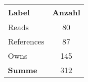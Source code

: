 \begin{table}[htb]
\begin{subtable}[c]{0.3\textwidth}
\begin{tabular}{|l|c|}
            \end{tabular}
            \label{table:findingsNewsFiguresContentNodesByClass}
        \end{subtable}
        \begin{subtable}[c]{0.3\textwidth}
            \centering
            \begin{tabular}{|l|c|}
                \hline
                \textbf{Label} & \multicolumn{1}{l|}{\textbf{Anzahl}} \\ \hline
                Reads          & 80                                   \\ \hline
                References     & 87                                   \\ \hline
                Owns           & 145                                  \\ \hline
                \hline
                \textbf{Summe} & 312                                  \\ \hline
                \end{tabular}
            \label{table:findingNewsFiguresEdgesByLabel}
        \end{subtable}


\end{table}
